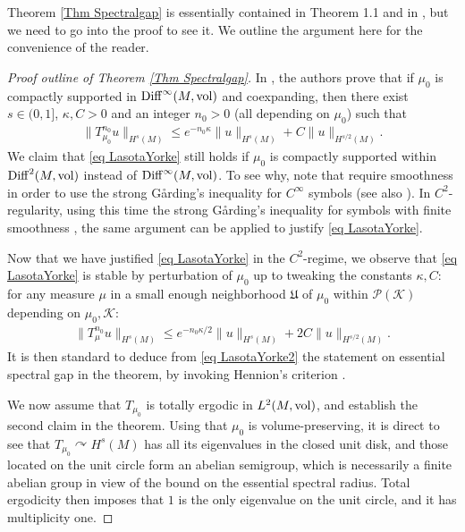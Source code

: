\documentclass[11pt, leqno, fleqn]{amsart}
\def\cU{\mathfrak U}
\newcommand{\margem}[1]{\marginpar{{\scriptsize {#1}}}}
\def\clo{   \color{orange}}
\newcommand{\SectionSymbol}{\textsection}
\newcommand{\acts}{\curvearrowright}
\newcommand{\cP}{{\mathcal P}}
\newcommand{\cK}{{\mathcal K}}
\newcommand{\ary}{\begin{eqnarray}}
\newcommand{\eary}{\end{eqnarray}}
\theoremstyle{definition}
\theoremstyle{definition}
\def \vol{  {\rm vol} }
\newcommand{\Diff}{{\rm Diff}}
\begin{document}
		 
		 Theorem \ref{Thm Spectralgap} is essentially contained in  Theorem 1.1 and  \SectionSymbol 2.7 in \cite{DD}, but we need to go into the proof to see it.
		 We outline the argument here for the convenience of the reader.
		 
		 \begin{proof}[Proof outline of Theorem \ref{Thm Spectralgap}]
		 	In \cite[Section 6]{DD}, the authors prove that if $\mu_{0}$ is compactly supported in $\Diff^{\infty}(M, \vol)$ and coexpanding, then there exist $s\in (0,1]$,  $\kappa, C > 0$ and an integer $n_0 > 0$ (all depending on $\mu_{0}$) such that 
					 	\ary \label{eq LasotaYorke}
		 	\|  T^{n_0}_{\mu_{0}} u \|_{H^s(M)} \leq e^{ - n_0 \kappa} \| u \|_{H^s(M)} + C \|  u \|_{H^{s/2}(M)}.
		 	\eary
		We claim that \eqref{eq LasotaYorke} still holds if  $\mu_{0}$ is compactly supported within $\Diff^{2}(M, \vol)$ instead of $\Diff^{\infty}(M, \vol)$. 	To see why, note that  \cite{DD} require smoothness in order to use the strong G\r{a}rding's inequality for $C^{\infty}$ symbols (see also  \cite{T1}). In $C^2$-regularity,  using this time  the strong G\r{a}rding's inequality for symbols with finite smoothness \cite[Prop 2.4.A]{T1}, the same argument can be applied to justify  \eqref{eq LasotaYorke}. 
		
		 	Now that we have justified \eqref{eq LasotaYorke} in the $C^2$-regime, we observe that \eqref{eq LasotaYorke} is stable by perturbation of $\mu_{0}$ up to tweaking the constants $\kappa, C$: for any  measure $\mu$ in  a small enough neighborhood $\cU$ of $\mu_{0}$ within $\cP(\cK)$ depending on $\mu_{0}, \cK$:
	\ary \label{eq LasotaYorke2}
		 	\|  T^{n_0}_{\mu} u \|_{H^s(M)} \leq e^{ - n_0 \kappa/2} \| u \|_{H^s(M)} + 2C \|  u \|_{H^{s/2}(M)}.
		 	\eary			
		 	It is then standard to deduce from \eqref{eq LasotaYorke2} the statement on essential spectral gap in the theorem, by invoking Hennion's criterion \cite{H3}. 
	
		 	
		 	We now assume that $T_{\mu_0}$ is totally ergodic in $L^2(M, \vol)$, and establish the second claim in the theorem. Using that $\mu_{0}$ is volume-preserving, it is direct to see that $T_{\mu_{0}}\acts H^s(M)$ has all its eigenvalues in the closed unit disk, and those located on the unit circle form an abelian semigroup,  which is necessarily a finite abelian group in view of the bound on the essential spectral radius. Total ergodicity then imposes that $1$ is the only eigenvalue on the unit circle, and it has multiplicity one.
		 	

\end{proof}
\end{document}
